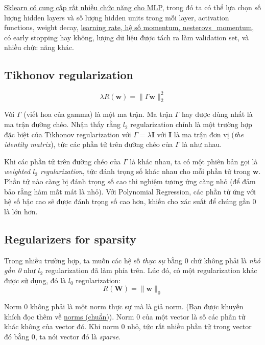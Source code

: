 \href{http://scikit-learn.org/stable/modules/neural_networks_supervised.html}{Sklearn có cung cấp rất nhiều chức năng cho MLP}, trong đó ta có thể lựa chọn số lượng hidden layers và số lượng hidden units trong mỗi layer, activation functions, weight decay, \href{http://machinelearningcoban.com/2017/01/16/gradientdescent2/}{learning rate, hệ số momentum, nesterovs\_momentum}, có early stopping hay không, lượng dữ liệu được tách ra làm validation set, và nhiều chức năng khác. 
 
 
\subsection{Tikhonov regularization}
\begin{equation*} 
\lambda R(\mathbf{w}) = \|\Gamma \mathbf{w}\|_2^2 
\end{equation*} 
 
Với $\Gamma$ (viết hoa của gamma) là một ma trận. Ma trận $\Gamma$ hay được dùng nhất là ma trận đường chéo. Nhận thấy rằng $l_2$ regularization chính là một trường hợp đặc biệt của Tikhonov regularization với $\Gamma = \lambda \mathbf{I}$ với $\mathbf{I}$ là ma trận đơn vị (\textit{the identity matrix}), tức các phần tử trên đường chéo của $\Gamma$ là như nhau. 
 
Khi các phần tử trên đường chéo của $\Gamma$ là khác nhau, ta có một phiên bản gọi là \textit{weighted $l_2$ regularization}, tức đánh trọng số khác nhau cho mỗi phần tử trong $\mathbf{w}$. Phần tử nào càng bị đánh trọng số cao thì nghiệm tương ứng càng nhỏ (để đảm bảo rằng hàm mất mát là nhỏ). Với Polynomial Regression, các phần tử ứng với hệ số bậc cao sẽ được đánh trọng số cao hơn, khiến cho xác suất để chúng gần 0 là lớn hơn. 
 
 
\subsection{Regularizers for sparsity}
 
Trong nhiều trường hợp, ta muốn các hệ số \textit{thực sự} bằng 0 chứ không phải là \textit{nhỏ gần 0} như $l_2$ regularization đã làm phía trên. Lúc đó, có một regularization khác được sử dụng, đó là $l_0$ regularization: 
\begin{equation*} 
R(\mathbf{W}) = \|\mathbf{w}\|_0 
\end{equation*} 
 
Norm 0 không phải là một norm thực sự mà là giả norm. (Bạn được khuyến khích đọc thêm về \href{http://machinelearningcoban.com/math/#-norms-chuan}{norms (chuẩn)}). Norm 0 của một vector là số các phần tử khác không của vector đó. Khi norm 0 nhỏ, tức rất nhiều phần tử trong vector đó bằng 0, ta nói vector đó là \textit{sparse}. 
 
